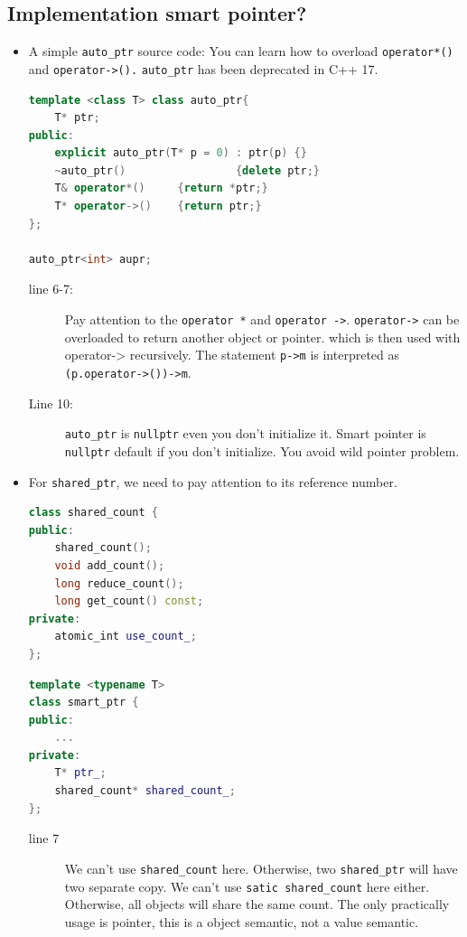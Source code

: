 \documentclass[a4paper,11pt,twoside]{book}
\begin{document}
\subsection{Implementation smart pointer?}
\begin{itemize}

		\item A simple \texttt{auto\_ptr} source code: You can learn how to overload \texttt{operator*()} and \texttt{operator->().} \texttt{auto\_ptr} has been deprecated in C++ 17.
\begin{lstlisting}[frame=single, language=c++, mathescape=true]
template <class T> class auto_ptr{
    T* ptr;
public:
    explicit auto_ptr(T* p = 0) : ptr(p) {}
    ~auto_ptr()                 {delete ptr;}
    T& operator*()     {return *ptr;}
    T* operator->()    {return ptr;}
};

auto_ptr<int> aupr;
\end{lstlisting}

\begin{description}
	\item[line 6-7:] Pay attention to the \texttt{operator *} and \texttt{operator ->}. \texttt{operator->} can be overloaded to return another object or pointer. which is then used with operator-> recursively. The statement \texttt{p->m} is interpreted as \texttt{(p.operator->())->m}. 
	
	\item[Line 10:] \texttt{auto\_ptr} is \texttt{nullptr} even you don't initialize it. Smart pointer is \texttt{nullptr} default if you don't initialize. You avoid wild pointer problem.
\end{description}

	\item For \texttt{shared\_ptr}, we need to pay attention to its reference number. 
\begin{lstlisting}[frame=single, language=c++, mathescape=true]
class shared_count {
public:
	shared_count();
	void add_count();
	long reduce_count();
	long get_count() const;
private:
	atomic_int use_count_;
};
\end{lstlisting}

\begin{lstlisting}[frame=single, language=c++, mathescape=true]
template <typename T>
class smart_ptr {
public:  
	...
private:  
	T* ptr_;  
	shared_count* shared_count_;
};
\end{lstlisting}

\begin{description}
	\item[line 7] We can't use \texttt{shared\_count} here. Otherwise, two \texttt{shared\_ptr} will have two separate copy. We can't use \texttt{satic shared\_count} here either. Otherwise, all objects will share the same count. The only practically usage is pointer, this is a object semantic, not a value semantic.  
\end{description}


\end{itemize}
\end{document}
